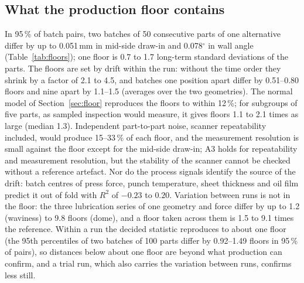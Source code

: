 \documentclass[pdflatex,sn-basic,lineno]{sn-jnl}
\begin{document}
\subsection{What the production floor contains}\label{sec:res-floor}

In 95\,\% of batch pairs, two batches of 50 consecutive parts of one alternative differ by up to 0.051\,mm in mid-side draw-in and 0.078$^\circ$ in wall angle (Table~\ref{tab:floors}); one floor is 0.7 to 1.7 long-term standard deviations of the parts. The floors are set by drift within the run: without the time order they shrink by a factor of 2.1 to 4.5, and batches one position apart differ by 0.51--0.80 floors and nine apart by 1.1--1.5 (averages over the two geometries). The normal model of Section~\ref{sec:floor} reproduces the floors to within 12\,\%; for subgroups of five parts, as sampled inspection would measure, it gives floors 1.1 to 2.1 times as large (median 1.3). Independent part-to-part noise, scanner repeatability included, would produce 15--33\,\% of each floor, and the measurement resolution is small against the floor except for the mid-side draw-in; A3 holds for repeatability and measurement resolution, but the stability of the scanner cannot be checked without a reference artefact. Nor do the process signals identify the source of the drift: batch centres of press force, punch temperature, sheet thickness and oil film predict it out of fold with $R^2$ of $-0.23$ to $0.20$. Variation between runs is not in the floor: the three lubrication series of one geometry and force differ by up to 1.2 (waviness) to 9.8 floors (dome), and a floor taken across them is 1.5 to 9.1 times the reference. Within a run the decided statistic reproduces to about one floor (the 95th percentiles of two batches of 100 parts differ by 0.92--1.49 floors in 95\,\% of pairs), so distances below about one floor are beyond what production can confirm, and a trial run, which also carries the variation between runs, confirms less still.
\end{document}

